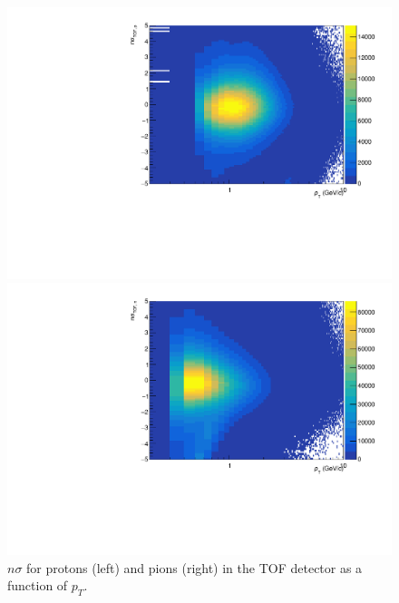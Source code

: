 \begin{figure}[h]
	\centering
	\begin{minipage}{0.48\textwidth}
		\includegraphics[width=\textwidth]{figures/analysis/nsigma_tof_proton.pdf}
	\end{minipage}
	\begin{minipage}{0.48\textwidth}
		\includegraphics[width=\textwidth]{figures/analysis/nsigma_tof_pion.pdf}
	\end{minipage}
    \caption{$n\sigma$ for protons (left) and pions (right) in the TOF detector as a function of $p_{T}$.}
	\label{fig:nsigma_tof}
\end{figure}

